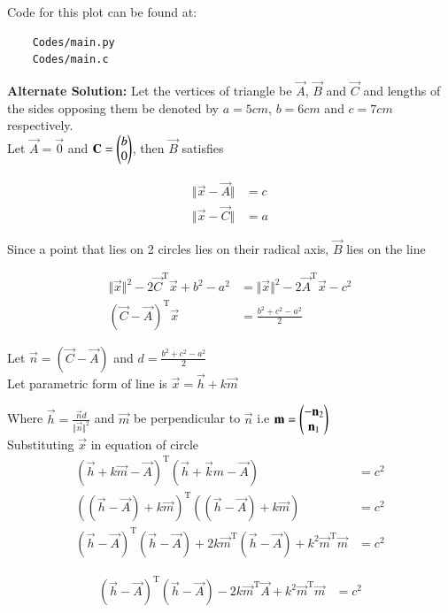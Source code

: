 \documentclass[journal]{IEEEtran}
\begin{document}
Code for this plot can be found at:
\begin{lstlisting}
    Codes/main.py
    Codes/main.c
\end{lstlisting}

\textbf{Alternate Solution: } Let the vertices of triangle be $\vec{A}$, $\vec{B}$ and $\vec{C}$ and lengths of the sides opposing them be denoted by $a = 5cm$, $b = 6cm$ and $c = 7cm$ respectively.
\\

Let $\vec{A} = \vec{0}$ and $\mathbf{C} = \begin{pmatrix}b \\ 0\end{pmatrix}$, then $\vec{B}$ satisfies

\begin{align*}
	\Vert \vec{x} - \vec{A} \Vert &= c\\
	\Vert \vec{x} - \vec{C} \Vert &= a
\end{align*}

Since a point that lies on 2 circles lies on their radical axis, $\vec{B}$ lies on the line

\begin{align*}
	\Vert \vec{x}\Vert^2 - 2\vec{C}^\text{T}\vec{x} + b^2 - a^2 &= \Vert \vec{x}\Vert^2 - 2\vec{A}^\text{T}\vec{x} - c^2 \\
	(\vec{C}-\vec{A})^\text{T}\vec{x} &= \frac{b^2 + c^2 - a^2}{2}
\end{align*}

Let $\vec{n} = (\vec{C} - \vec{A})$ and $d = \frac{b^2 + c^2 - a^2}{2}$
\\

Let parametric form of line is $\vec{x} = \vec{h} + k\vec{m}$

Where $\vec{h} = \frac{\vec{n}d}{\Vert \vec{n} \Vert^2}$ and $\vec{m}$ be perpendicular to $\vec{n}$ i.e $\mathbf{m} = \begin{pmatrix}-\mathbf{n}_2 \\ \mathbf{n}_1\end{pmatrix}$
\\

Substituting $\vec{x}$ in equation of circle
\begin{align*}
	(\vec{h} + k\vec{m} - \vec{A})^\text{T} (\vec{h} + \vec{k}m - \vec{A}) &= c^2\\
	((\vec{h} - \vec{A}) + k\vec{m})^\text{T} ((\vec{h} - \vec{A}) + k\vec{m}) &= c^2\\
	(\vec{h} - \vec{A})^\text{T}(\vec{h} - \vec{A}) + 2k\vec{m}^\text{T}(\vec{h} - \vec{A}) + k^2\vec{m}^\text{T}\vec{m} &= c^2
\end{align*}

\begin{align*}
	(\vec{h} - \vec{A})^\text{T}(\vec{h} - \vec{A}) - 2k\vec{m}^\text{T}\vec{A} + k^2\vec{m}^\text{T}\vec{m} &= c^2	
\end{align*}
\end{document}
